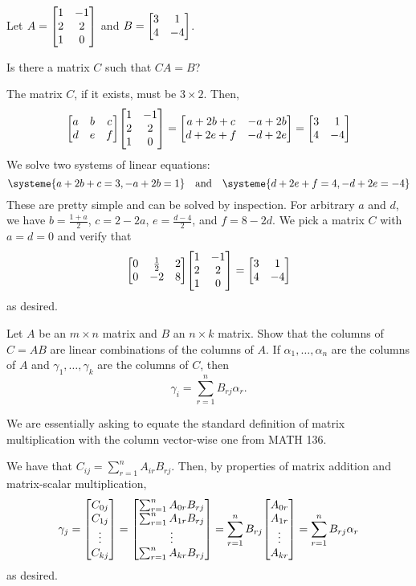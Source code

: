 \documentclass[notes]{agony}
\begin{document}
\begin{xca}
  Let $A = \mqty[1&-1\\2&2\\1&0]$ and $B = \mqty[3&1\\4&-4]$.

  Is there a matrix $C$ such that $CA = B$?
\end{xca}
\begin{sol}
  The matrix $C$, if it exists, must be $3 \times 2$. Then,
  \[ \mqty[a&b&c\\d&e&f]\mqty[1&-1\\2&2\\1&0] = \mqty[a+2b+c&-a+2b\\d+2e+f&-d+2e] = \mqty[3&1\\4&-4] \]
  We solve two systems of linear equations:
  \[ \systeme{a+2b+c=3,-a+2b=1} \qq{and} \systeme{d+2e+f=4,-d+2e=-4} \]
  These are pretty simple and can be solved by inspection.
  For arbitrary $a$ and $d$, we have $b = \frac{1+a}{2}$, $c = 2-2a$, $e = \frac{d-4}{2}$, and $f = 8-2d$.
  We pick a matrix $C$ with $a = d = 0$ and verify that
  \[ \mqty[0&\frac12&2\\0&-2&8]\mqty[1&-1\\2&2\\1&0] = \mqty[3&1\\4&-4] \]
  as desired.
\end{sol}

\begin{xca}\label{xca:vecmult}
  Let $A$ be an $m \times n$ matrix and $B$ an $n \times k$ matrix.
  Show that the columns of $C = AB$ are linear combinations of the columns of $A$.
  If $\alpha_1,\dotsc,\alpha_n$ are the columns of $A$ and $\gamma_1,\dotsc,\gamma_k$ are the columns of $C$,
  then \[ \gamma_i = \sum_{r=1}^n B_{rj}\alpha_r. \]
\end{xca}
\begin{prf}
  We are essentially asking to equate the standard definition of matrix multiplication with
  the column vector-wise one from MATH 136.

  We have that $C_{ij} = \sum_{r=1}^n A_{ir}B_{rj}$.
  Then, by properties of matrix addition and matrix-scalar multiplication,
  \begin{equation*}
    \gamma_j = \mqty[C_{0j} \\ C_{1j} \\ \vdots \\ C_{kj}]
    = \mqty[\sum_{r=1}^n A_{0r}B_{rj} \\ \sum_{r=1}^n A_{1r}B_{rj} \\ \vdots \\ \sum_{r=1}^n A_{kr}B_{rj}]
    = \sum_{r=1}^n B_{rj} \mqty[A_{0r} \\ A_{1r} \\ \vdots \\ A_{kr}]
    = \sum_{r=1}^n B_{rj} \alpha_r
  \end{equation*}
  as desired.
\end{prf}
\end{document}
